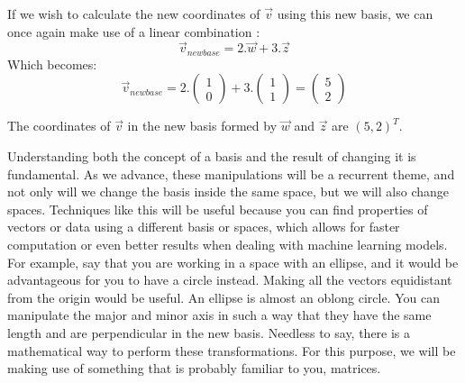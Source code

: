\documentclass[600paper, 11pt,twoside,openany]{kdp}
\begin{document}
\indent If we wish to calculate the new coordinates of $\overrightarrow{v}$ using this new basis, we can once again make use of a linear combination :
\[ \overrightarrow{v}_{new base} = 2.\overrightarrow{w}+ 3.\overrightarrow{z} \]
\indent Which becomes:
\[ \overrightarrow{v}_{new base} = 2.\begin{pmatrix}
 1 \\
 0
 \end{pmatrix} + 3.\begin{pmatrix}
 1 \\
 1
 \end{pmatrix} = \begin{pmatrix}
 5 \\
 2
 \end{pmatrix} \]

\indent The coordinates of $\overrightarrow{v}$ in the new basis formed by $\overrightarrow{w}$ and $\overrightarrow{z}$ are $(5,2)^T$.
\par 
\vspace{-3pt}
\indent Understanding both the concept of a basis and the result of changing it is fundamental. As we advance, these manipulations will be a recurrent theme, and not only will we change the basis inside the same space, but we will also change spaces. Techniques like this will be useful because you can find properties of vectors or data using a different basis or spaces, which allows for faster computation or even better results when dealing with machine learning models. For example, say that you are working in a space with an ellipse, and it would be advantageous for you to have a circle instead. Making all the vectors equidistant from the origin would be useful. An ellipse is almost an oblong circle. You can manipulate the major and minor axis in such a way that they have the same length and are perpendicular in the new basis. Needless to say, there is a mathematical way to perform these transformations. For this purpose, we will be making use of something that is probably familiar to you, matrices.
\end{document}

